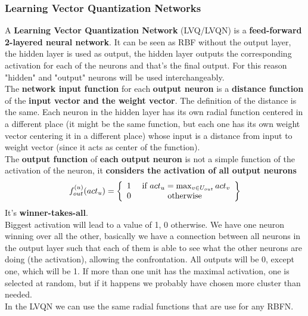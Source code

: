 \newpage

\subsubsection{Learning Vector Quantization Networks}
A \textbf{Learning Vector Quantization Network} (LVQ/LVQN) is a \textbf{feed-forward 2-layered neural network}. It can be seen as RBF without the output layer, the hidden layer is used as output, the hidden layer outputs the corresponding activation for each of the neurons and that's the final output. For this reason "hidden" and "output" neurons will be used interchangeably.\\

The \textbf{network input function} for each \textbf{output neuron} is a \textbf{distance function} of the \textbf{input vector and the weight vector}. The definition of the distance is the same. Each neuron in the hidden layer has its own radial function centered in a different place (it might be the same function, but each one has its own weight vector centering it in a different place) whose input is a distance from input to weight vector (since it acts as center of the function).\\

The \textbf{output function} of \textbf{each output neuron} is not a simple function of the activation of the neuron, it \textbf{considers the activation of all output neurons}
$$ f_{out}^{(u)} (act_u) = \left\{
\begin{array}{c c}
	1 & \text{ if } act_u = \max_{v \in U_{out}} act_v \\
	0 & \text{ otherwise }
\end{array}
\right\}$$ 
It's \textbf{winner-takes-all}. \\

Biggest activation will lead to a value of 1, 0 otherwise. We have one neuron winning over all the other, basically we have a connection between all neurons in the output layer such that each of them is able to see what the other neurons are doing (the activation), allowing the confrontation. All outputs will be 0, except one, which will be 1. If more than one unit has the maximal activation, one is selected at random, but if it happens we probably have chosen more cluster than needed.\\

In the LVQN we can use the same radial functions that are use for any RBFN.

\newpage


